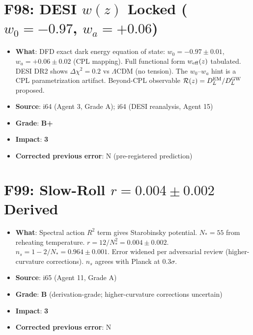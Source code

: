 \documentclass[11pt,a4paper]{article}
\newcommand{\grade}[1]{\textbf{#1}}
\newcommand{\impact}[1]{\textbf{#1}}
\begin{document}
\section{F98: DESI $w(z)$ Locked ($w_0 = -0.97$, $w_a = +0.06$)}
\begin{itemize}[nosep]
\item \textbf{What}: DFD exact dark energy equation of state: $w_0 = -0.97 \pm 0.01$, $w_a = +0.06 \pm 0.02$ (CPL mapping). Full functional form $w_{\rm eff}(z)$ tabulated. DESI DR2 shows $\Delta\chi^2 = 0.2$ vs $\Lambda$CDM (no tension). The $w_0$--$w_a$ hint is a CPL parametrization artifact. Beyond-CPL observable $\mathcal{R}(z) = D_L^{\rm EM}/D_L^{\rm GW}$ proposed.
\item \textbf{Source}: i64 (Agent 3, Grade A); i64 (DESI reanalysis, Agent 15)
\item \textbf{Grade}: \grade{B+}
\item \textbf{Impact}: \impact{3}
\item \textbf{Corrected previous error}: N (pre-registered prediction)
\end{itemize}

\section{F99: Slow-Roll $r = 0.004 \pm 0.002$ Derived}
\begin{itemize}[nosep]
\item \textbf{What}: Spectral action $R^2$ term gives Starobinsky potential. $N_* = 55$ from reheating temperature. $r = 12/N_*^2 = 0.004 \pm 0.002$. $n_s = 1 - 2/N_* = 0.964 \pm 0.001$. Error widened per adversarial review (higher-curvature corrections). $n_s$ agrees with Planck at $0.3\sigma$.
\item \textbf{Source}: i65 (Agent 11, Grade A)
\item \textbf{Grade}: \grade{B} (derivation-grade; higher-curvature corrections uncertain)
\item \textbf{Impact}: \impact{3}
\item \textbf{Corrected previous error}: N
\end{itemize}

\end{document}
